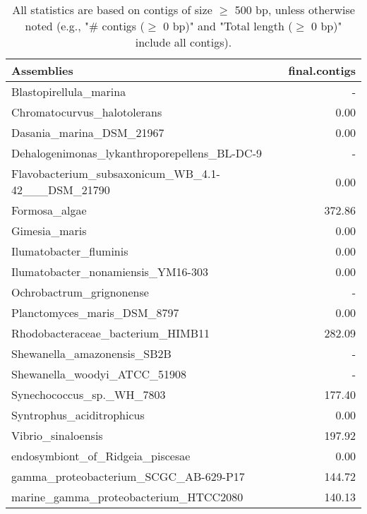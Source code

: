 \documentclass[12pt,a4paper]{article}
\begin{document}
\begin{table}[ht]
\begin{center}
\caption{All statistics are based on contigs of size $\geq$ 500 bp, unless otherwise noted (e.g., "\# contigs ($\geq$ 0 bp)" and "Total length ($\geq$ 0 bp)" include all contigs).}
\begin{tabular}{|l*{1}{|r}|}
\hline
Assemblies & final.contigs \\ \hline
Blastopirellula\_marina & - \\ \hline
Chromatocurvus\_halotolerans & 0.00 \\ \hline
Dasania\_marina\_DSM\_21967 & 0.00 \\ \hline
Dehalogenimonas\_lykanthroporepellens\_BL-DC-9 & - \\ \hline
Flavobacterium\_subsaxonicum\_WB\_4.1-42\_\_\_DSM\_21790 & 0.00 \\ \hline
Formosa\_algae & 372.86 \\ \hline
Gimesia\_maris & 0.00 \\ \hline
Ilumatobacter\_fluminis & 0.00 \\ \hline
Ilumatobacter\_nonamiensis\_YM16-303 & 0.00 \\ \hline
Ochrobactrum\_grignonense & - \\ \hline
Planctomyces\_maris\_DSM\_8797 & 0.00 \\ \hline
Rhodobacteraceae\_bacterium\_HIMB11 & 282.09 \\ \hline
Shewanella\_amazonensis\_SB2B & - \\ \hline
Shewanella\_woodyi\_ATCC\_51908 & - \\ \hline
Synechococcus\_sp.\_WH\_7803 & 177.40 \\ \hline
Syntrophus\_aciditrophicus & 0.00 \\ \hline
Vibrio\_sinaloensis & 197.92 \\ \hline
endosymbiont\_of\_Ridgeia\_piscesae & 0.00 \\ \hline
gamma\_proteobacterium\_SCGC\_AB-629-P17 & 144.72 \\ \hline
marine\_gamma\_proteobacterium\_HTCC2080 & 140.13 \\ \hline
\end{tabular}
\end{center}
\end{table}
\end{document}
